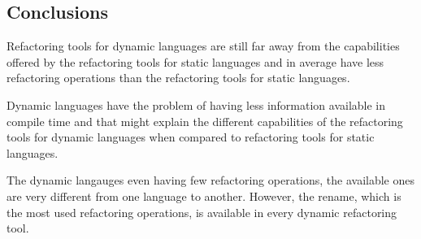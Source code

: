 

\subsection{Conclusions}

Refactoring tools for dynamic languages are still far away from the capabilities offered by the refactoring tools for static languages and in average have less refactoring operations than the refactoring tools for static languages.

Dynamic languages have the problem of having less information available in compile time and that might explain the different capabilities of the refactoring tools for dynamic languages when compared to refactoring tools for static languages. 

The dynamic langauges even having few refactoring operations, the available ones are very different from one language to another. However, the rename, which is the most used refactoring operations, is available in every dynamic refactoring tool.

